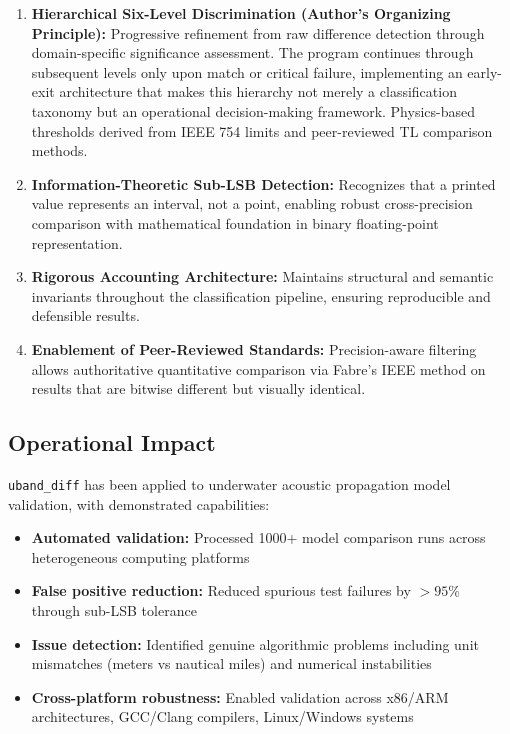 \documentclass[11pt,letterpaper]{article}
\newcommand{\ubdiff}{\texttt{uband\_diff}}
\begin{document}
\begin{enumerate}
    \item \textbf{Hierarchical Six-Level Discrimination (Author's Organizing Principle):} Progressive refinement from raw difference detection through domain-specific significance assessment. The program continues through subsequent levels only upon match or critical failure, implementing an early-exit architecture that makes this hierarchy not merely a classification taxonomy but an operational decision-making framework. Physics-based thresholds derived from IEEE 754 limits and peer-reviewed TL comparison methods.

    \item \textbf{Information-Theoretic Sub-LSB Detection:} Recognizes that a printed value represents an interval, not a point, enabling robust cross-precision comparison with mathematical foundation in binary floating-point representation.

    \item \textbf{Rigorous Accounting Architecture:} Maintains structural and semantic invariants throughout the classification pipeline, ensuring reproducible and defensible results.

    \item \textbf{Enablement of Peer-Reviewed Standards:} Precision-aware filtering allows authoritative quantitative comparison via Fabre's IEEE method \cite{fabre2009} on results that are bitwise different but visually identical.
\end{enumerate}

\subsection{Operational Impact}

\ubdiff{} has been applied to underwater acoustic propagation model validation, with demonstrated capabilities:

\begin{itemize}
    \item \textbf{Automated validation:} Processed 1000+ model comparison runs across heterogeneous computing platforms
    \item \textbf{False positive reduction:} Reduced spurious test failures by $>95\%$ through sub-LSB tolerance
    \item \textbf{Issue detection:} Identified genuine algorithmic problems including unit mismatches (meters vs nautical miles) and numerical instabilities
    \item \textbf{Cross-platform robustness:} Enabled validation across x86/ARM architectures, GCC/Clang compilers, Linux/Windows systems
\end{itemize}
\end{document}
